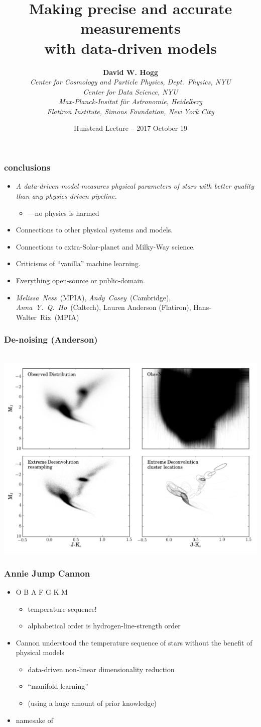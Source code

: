 \documentclass[pdftex]{beamer}
\title{Making precise and accurate measurements \\ with data-driven models}
\author[David W. Hogg (NYU)]{\textbf{David W. Hogg} \\
  \textsl{\footnotesize Center for Cosmology and Particle Physics, Dept.~Physics, NYU} \\
  \textsl{\footnotesize Center for Data Science, NYU} \\
  \textsl{\footnotesize Max-Planck-Insitut f\"ur Astronomie, Heidelberg} \\
  \textsl{\footnotesize Flatiron Institute, Simons Foundation, New York City}}
\date{Hunstead Lecture -- 2017 October 19}
\newcommand{\conclusions}{%
\begin{frame}
  \frametitle{conclusions}
  \begin{itemize}
  \item \emph{A data-driven model measures physical parameters of stars with better quality than any physics-driven pipeline.}
    \begin{itemize}
    \item \tc ---no physics is harmed
    \end{itemize}
  \item Connections to other physical systems and models.
  \item Connections to extra-Solar-planet and Milky-Way science.
  \item Criticisms of ``vanilla'' machine learning.
  \item Everything open-source or public-domain.
  \item \emph{Melissa~Ness}~(MPIA), \emph{Andy~Casey}~(Cambridge), \emph{Anna~Y.~Q.~Ho}~(Caltech), Lauren Anderson (Flatiron), Hans-Walter~Rix~(MPIA)
  \end{itemize}
\end{frame}}
\begin{document}
\sloppy\sloppypar\raggedright\raggedbottom\frenchspacing

\begin{frame}
  \titlepage
\end{frame}

\conclusions

\begin{frame}
  \frametitle{De-noising (Anderson)}
  \,\hfill\includegraphics[height=\figureheight]{priorLMA.png}%
\end{frame}

\begin{frame}
  \frametitle{Annie Jump Cannon}
  \begin{itemize}
  \item O B A F G K M
    \begin{itemize}
    \item temperature sequence!
    \item alphabetical order is hydrogen-line-strength order
    \end{itemize}
  \item Cannon understood the temperature sequence of stars without the benefit of physical models
    \begin{itemize}
    \item data-driven non-linear dimensionality reduction
    \item ``manifold learning''
    \item (using a huge amount of prior knowledge)
    \end{itemize}
  \item namesake of \tc
  \end{itemize}
\end{frame}
\end{document}
